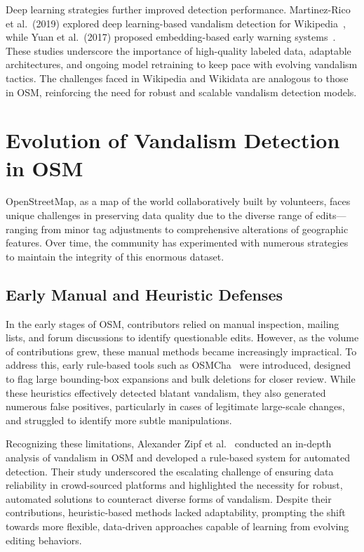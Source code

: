 \documentclass[
    13pt, %
    a4paper, %
    listof=totoc, %
    bibliography=totoc, %
    index=totoc, %
    headsepline
]{scrreprt}
\begin{document}
Deep learning strategies further improved detection performance. Martinez-Rico et al.\ (2019) explored deep learning-based vandalism detection for Wikipedia~\cite{MartinezRico2019}, while Yuan et al.\ (2017) proposed embedding-based early warning systems~\cite{Yuan2017}. These studies underscore the importance of high-quality labeled data, adaptable architectures, and ongoing model retraining to keep pace with evolving vandalism tactics. The challenges faced in Wikipedia and Wikidata are analogous to those in OSM, reinforcing the need for robust and scalable vandalism detection models.


\section{Evolution of Vandalism Detection in OSM}
\label{sec:evolution_osm_vandalism}

OpenStreetMap, as a map of the world collaboratively built by volunteers, faces unique challenges in preserving data quality due to the diverse range of edits—ranging from minor tag adjustments to comprehensive alterations of geographic features. Over time, the community has experimented with numerous strategies to maintain the integrity of this enormous dataset.

\subsection{Early Manual and Heuristic Defenses}

In the early stages of OSM, contributors relied on manual inspection, mailing lists, and forum discussions to identify questionable edits. However, as the volume of contributions grew, these manual methods became increasingly impractical. To address this, early rule-based tools such as OSMCha~\cite{OSMCha} were introduced, designed to flag large bounding-box expansions and bulk deletions for closer review. While these heuristics effectively detected blatant vandalism, they also generated numerous false positives, particularly in cases of legitimate large-scale changes, and struggled to identify more subtle manipulations.

Recognizing these limitations, Alexander Zipf et al.~\cite{OSMPatrol} conducted an in-depth analysis of vandalism in OSM and developed a rule-based system for automated detection. Their study underscored the escalating challenge of ensuring data reliability in crowd-sourced platforms and highlighted the necessity for robust, automated solutions to counteract diverse forms of vandalism. Despite their contributions, heuristic-based methods lacked adaptability, prompting the shift towards more flexible, data-driven approaches capable of learning from evolving editing behaviors.
\end{document}
